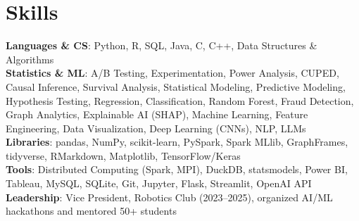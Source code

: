 \documentclass[letterpaper,11pt]{article}
\begin{document}
\section{Skills}
 \begin{itemize}[leftmargin=0.15in, label={}]
    \small{\item{
     \textbf{Languages \& CS}{: Python, R, SQL, Java, C, C++, Data Structures \& Algorithms} \\
     \textbf{Statistics \& ML}{: A/B Testing, Experimentation, Power Analysis, CUPED, Causal Inference, Survival Analysis, Statistical Modeling, Predictive Modeling, Hypothesis Testing, Regression, Classification, Random Forest, Fraud Detection, Graph Analytics, Explainable AI (SHAP), Machine Learning, Feature Engineering, Data Visualization, Deep Learning (CNNs), NLP, LLMs} \\
     \textbf{Libraries}{: pandas, NumPy, scikit-learn, PySpark, Spark MLlib, GraphFrames, tidyverse, RMarkdown, Matplotlib, TensorFlow/Keras} \\
     \textbf{Tools}{: Distributed Computing (Spark, MPI), DuckDB, statsmodels, Power BI, Tableau, MySQL, SQLite, Git, Jupyter, Flask, Streamlit, OpenAI API} \\
     \textbf{Leadership}{: Vice President, Robotics Club (2023--2025), organized AI/ML hackathons and mentored 50+ students}
    }}
 \end{itemize}
\end{document}

